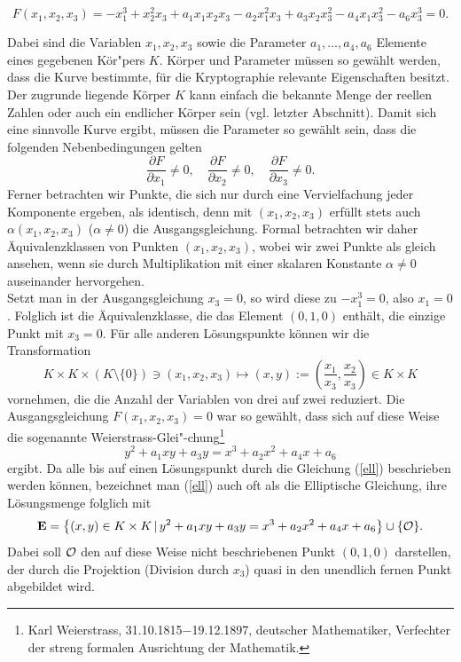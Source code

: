 \begin{refsegment}
\begin{equation}
 F(x_1,x_2,x_3)=-x_1^3+x_2^2x_3+a_1x_1x_2x_3-a_2x_1^2x_3+a_3x_2x_3^2-a_4x_1x_3^2-a_6x_3^3=0.
\label{eccbasisgleichung}
\end{equation}

Dabei sind die Variablen $x_1,x_2,x_3$ sowie die Parameter $a_1,\dots,a_4,a_6$ Elemente eines gegebenen Kör"pers $K$. Körper und Parameter müssen so gewählt werden, dass die Kurve bestimmte, für die Kryptographie relevante Eigenschaften besitzt. Der zugrunde liegende Körper $K$ kann einfach die bekannte Menge der reellen Zahlen oder auch ein endlicher Körper sein (vgl. letzter Abschnitt).
Damit sich eine sinnvolle Kurve ergibt, müssen die Parameter so gewählt sein, dass die folgenden Nebenbedingungen gelten
$$ \frac{\partial F}{\partial x_1}\ne 0, \quad \frac{\partial F}{\partial x_2}\ne 0, \quad
\frac{\partial F}{\partial x_3}\ne 0 .
$$
Ferner betrachten wir Punkte, die sich nur durch eine Vervielfachung jeder Komponente ergeben, als identisch, denn mit $(x_1,x_2,x_3)$ erfüllt stets auch $\alpha (x_1,x_2,x_3)$ ($\alpha\ne 0$) die Ausgangsgleichung. Formal betrachten wir daher Äquivalenzklassen von Punkten $(x_1,x_2,x_3)$, wobei wir zwei Punkte als gleich ansehen, wenn sie durch Multiplikation mit einer skalaren Konstante $\alpha \ne 0$ auseinander hervorgehen.
\\ Setzt man in der Ausgangsgleichung $x_3=0$, so wird diese zu $-x_1^3=0$, also $x_1=0$. Folglich ist die Äquivalenzklasse, die das Element $(0,1,0)$ enthält, die einzige Punkt mit $x_3=0$. Für alle anderen Lösungspunkte können wir die Transformation
$$ K\times K\times (K\setminus\{0\})\ni (x_1,x_2,x_3) \mapsto (x,y):=\left( \frac{x_1}{x_3}, \frac{x_2}{x_3}\right) \in K\times K
$$
vornehmen, die die Anzahl der Variablen von drei auf zwei reduziert.
Die Ausgangsgleichung $F(x_1,x_2,x_3)=0$ war so gewählt, dass sich auf
diese Weise die sogenannte Weierstrass-Glei"-chung\footnote{%
Karl Weierstrass, 31.10.1815$-$19.12.1897, deutscher Mathematiker,
Verfechter der streng formalen Ausrichtung der Mathematik.
}
\begin{equation}
 y^2+a_1xy+a_3y = x^3+a_2x^2+a_4x+a_6
\label{ell}
\end{equation}
ergibt.
Da alle bis auf einen Lösungspunkt durch die Gleichung (\ref{ell}) beschrieben werden können, bezeichnet man (\ref{ell}) auch oft als die Elliptische Gleichung, ihre Lösungsmenge folglich mit
$$ {\bf E} = \left\{(x,y)\in K\times K \, |\, y^2+a_1xy+a_3y = x^3+a_2x^2+a_4x+a_6  \right\} \cup \{{\cal O} \}.
$$
Dabei soll ${\cal O}$ den auf diese Weise nicht beschriebenen Punkt $(0,1,0)$ darstellen, der durch die Projektion (Division durch $x_3$) quasi in den unendlich fernen Punkt abgebildet wird.


\end{refsegment}
